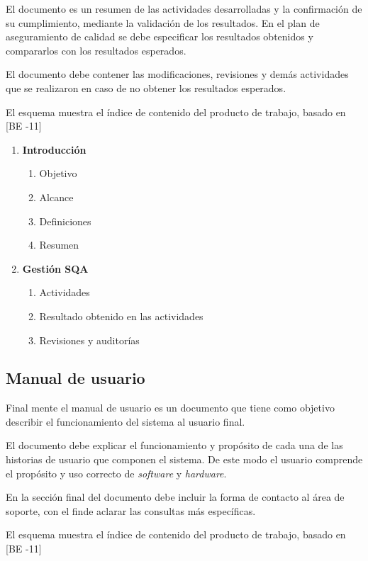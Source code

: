El documento es un resumen de las actividades desarrolladas y la confirmación de su cumplimiento, mediante la validación de los resultados. En el plan de aseguramiento de calidad se debe especificar los resultados obtenidos y compararlos con los resultados esperados.

El documento debe contener las modificaciones, revisiones y demás actividades que se realizaron en caso de no obtener los resultados esperados.

El esquema muestra el índice de contenido del producto de trabajo, basado en [BE -11]

\begin{framed}
    \begin{enumerate}
		\item \textbf{Introducción}
		\begin{enumerate}
			\item Objetivo
			\item Alcance
			\item Definiciones
			\item Resumen
		\end{enumerate}
		\item \textbf{Gestión SQA}
		\begin{enumerate}
			\item Actividades
			\item Resultado obtenido en las actividades
			\item Revisiones y auditorías
		\end{enumerate}
	\end{enumerate}
\end{framed}

\subsection{Manual de usuario}
Final mente el manual de usuario es un documento que tiene como objetivo describir el funcionamiento del sistema al usuario final. 

El documento debe explicar el funcionamiento y propósito de cada una de las historias de usuario que componen el sistema. De este modo el usuario comprende el propósito y uso correcto de \emph{software} y \emph{hardware}.

En la sección final del documento debe incluir la forma de contacto al área de soporte, con el finde aclarar las consultas más específicas.

El esquema muestra el índice de contenido del producto de trabajo, basado en [BE -11]

